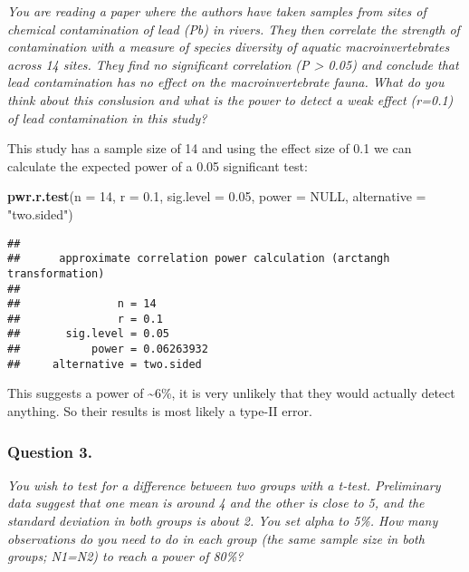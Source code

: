 \documentclass[
]{article}
\newenvironment{Shaded}{\begin{snugshade}}{\end{snugshade}}
\newcommand{\AttributeTok}[1]{\textcolor[rgb]{0.13,0.29,0.53}{#1}}
\newcommand{\ConstantTok}[1]{\textcolor[rgb]{0.56,0.35,0.01}{#1}}
\newcommand{\DecValTok}[1]{\textcolor[rgb]{0.00,0.00,0.81}{#1}}
\newcommand{\FloatTok}[1]{\textcolor[rgb]{0.00,0.00,0.81}{#1}}
\newcommand{\FunctionTok}[1]{\textcolor[rgb]{0.13,0.29,0.53}{\textbf{#1}}}
\newcommand{\NormalTok}[1]{#1}
\newcommand{\StringTok}[1]{\textcolor[rgb]{0.31,0.60,0.02}{#1}}
\begin{document}
\emph{You are reading a paper where the authors have taken samples from
sites of chemical contamination of lead (Pb) in rivers. They then
correlate the strength of contamination with a measure of species
diversity of aquatic macroinvertebrates across 14 sites. They find no
significant correlation (P \textgreater{} 0.05) and conclude that lead
contamination has no effect on the macroinvertebrate fauna. What do you
think about this conslusion and what is the power to detect a weak
effect (r=0.1) of lead contamination in this study?}

This study has a sample size of 14 and using the effect size of 0.1 we
can calculate the expected power of a 0.05 significant test:

\begin{Shaded}
\begin{Highlighting}[]
\FunctionTok{pwr.r.test}\NormalTok{(}\AttributeTok{n =} \DecValTok{14}\NormalTok{, }\AttributeTok{r =} \FloatTok{0.1}\NormalTok{, }\AttributeTok{sig.level =} \FloatTok{0.05}\NormalTok{, }\AttributeTok{power =} \ConstantTok{NULL}\NormalTok{, }\AttributeTok{alternative =} \StringTok{"two.sided"}\NormalTok{)}
\end{Highlighting}
\end{Shaded}

\begin{verbatim}
## 
##      approximate correlation power calculation (arctangh transformation) 
## 
##               n = 14
##               r = 0.1
##       sig.level = 0.05
##           power = 0.06263932
##     alternative = two.sided
\end{verbatim}

This suggests a power of \textasciitilde6\%, it is very unlikely that
they would actually detect anything. So their results is most likely a
type-II error.

\subsubsection{Question 3.}\label{question-3.}

\emph{You wish to test for a difference between two groups with a
t-test. Preliminary data suggest that one mean is around 4 and the other
is close to 5, and the standard deviation in both groups is about 2. You
set alpha to 5\%. How many observations do you need to do in each group
(the same sample size in both groups; N1=N2) to reach a power of 80\%?}
\end{document}
